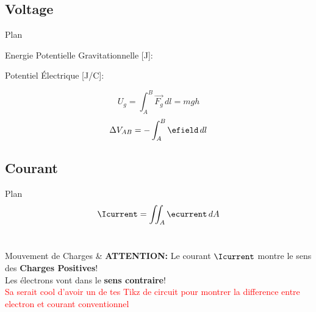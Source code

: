 \subsection[2min - Max]{Voltage}
\begin{frame}{Plan}
    \begin{twocolumns}[0.5]
        \leftcol
            \begin{center}
            Energie Potentielle Gravitationnelle [J]:
            \end{center}
        \rightcol
            \begin{center}
            Potentiel Électrique [J/C]:\\
            \end{center}
    \end{twocolumns}
    \begin{twocolumns}[0.5]
        \leftcol
            \begin{equation}
                U_{g} = \int_{A}^{B}\vec{F_g} \,dl =  mgh
            \end{equation}
        \rightcol
            \begin{equation}
                \Delta V_{AB} = -\int_{A}^{B}\efield \,dl
            \end{equation}
    \end{twocolumns}
    \vspace{-24pt}
    \begin{twocolumns}[0.5]
        \leftcol
        \rightcol
    \end{twocolumns}
    \vfill
\end{frame}

\subsection[2min - Max]{Courant}
\begin{frame}{Plan}
    \begin{equation}
        \Icurrent = \iint_A \ecurrent \,dA
    \end{equation}\\
    \vspace{20pt}
\end{frame}


\begin{frame}{Mouvement de Charges}
    \centering
    \icon[green]{\faExclamationTriangle} & \textbf{ATTENTION:} Le courant $\Icurrent$ montre le sens des \textbf{Charges Positives}!\\
    Les électrons vont dans le \textbf{sens contraire}!\\
    \vspace{20pt}
    \textcolor{red}{Sa serait cool d'avoir un de tes Tikz de circuit pour montrer la difference entre electron et courant conventionnel}
\end{frame}

